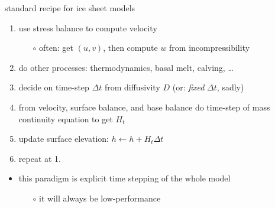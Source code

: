 \begin{frame}{standard recipe for ice sheet models}

\begin{enumerate}
  \item use stress balance to compute velocity
      \begin{itemize}
      \item[$\circ$] often: get $(u,v)$, then compute $w$ from incompressibility
      \end{itemize}
  \item do other processes: thermodynamics, basal melt, calving, \dots
  \item decide on time-step $\Delta t$ from diffusivity $D$ \hfill (or: \emph{fixed} $\Delta t$, sadly)
  \item from velocity, surface balance, and base balance do time-step of mass continuity equation to get $H_t$
  \item update surface elevation: $h \gets h+H_t \Delta t$
  \item repeat at 1.
\end{enumerate}

\bigskip
\begin{itemize}
\item this paradigm is \alert{explicit time stepping of the whole model}
  \begin{itemize}
  \item[$\circ$]  it will always be low-performance
  \end{itemize}
\end{itemize}
\end{frame}
